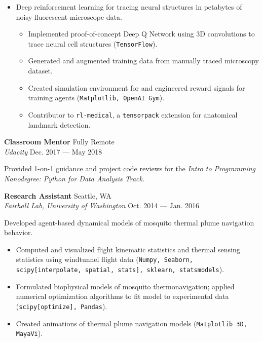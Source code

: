 \documentclass[a4paper,12pt]{article}
\newcommand{\ressubheading}[4]{{\begin{minipage}{\textwidth}
                                    \textbf{#1} \hfill #2 \\
                                    \textit{#3} \hfill #4 \\
\end{minipage}}}
\begin{document}
    \begin{itemize}
        \item Deep reinforcement learning for tracing neural structures in petabytes of noisy fluorescent microscope data.

        \begin{itemize}
            \item Implemented proof-of-concept Deep Q Network using 3D convolutions to trace neural cell structures (\texttt{TensorFlow}).
            \item Generated and augmented training data from manually traced microscopy dataset.
            \item Created simulation environment for and engineered reward signals for training agents (\texttt{Matplotlib, OpenAI Gym}).
            \item Contributor to \texttt{rl-medical}, a \texttt{tensorpack} extension for anatomical landmark detection.
        \end{itemize}

    \end{itemize}

    \ressubheading{Classroom Mentor}{Fully Remote}{Udacity}{Dec. 2017 --- May 2018}

    Provided 1-on-1 guidance and project code reviews for the \textit{Intro to Programming Nanodegree: Python for Data Analysis Track}.\\

    \ressubheading{Research Assistant}{Seattle, WA}{Fairhall Lab, University of Washington}{Oct. 2014 --- Jan. 2016}

    \vspace{-6pt} Developed agent-based dynamical models of mosquito thermal plume navigation behavior.

    \begin{itemize}
        \item Computed and visualized flight kinematic statistics and thermal sensing statistics using windtunnel flight data (\texttt{Numpy, Seaborn, scipy[interpolate, spatial, stats], sklearn, statsmodels}).
        \item Formulated biophysical models of mosquito thermonavigation;
        applied numerical optimization algorithms to fit model to experimental data (\texttt{scipy[optimize], Pandas}).
        \item Created animations of thermal plume navigation models (\texttt{Matplotlib 3D, MayaVi}).
    \end{itemize}
\end{document}
